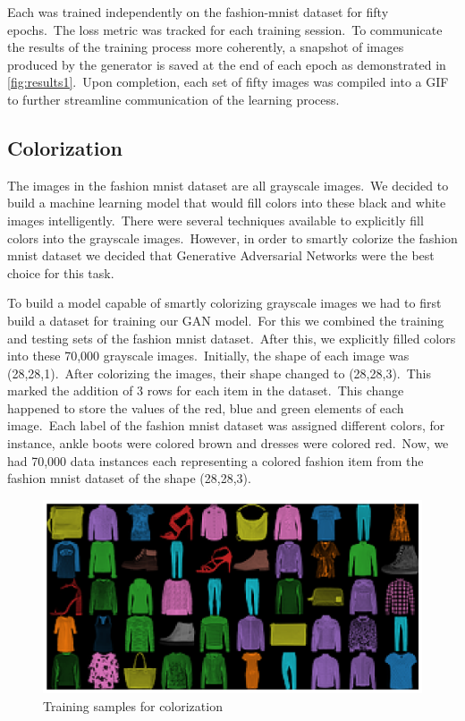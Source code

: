 \documentclass[conference]{IEEEtran}
\begin{document}
    Each was trained independently on the fashion-mnist dataset for fifty epochs.\ The loss metric was tracked for each training session.\ To communicate the results of the training process more coherently, a snapshot of images produced by the generator is saved at the end of each epoch as demonstrated in \autoref{fig:results1}.\ Upon completion, each set of fifty images was compiled into a GIF to further streamline communication of the learning process.

    \subsection{Colorization}\label{subsec:implementation-colorization}

    The images in the fashion mnist dataset are all grayscale images.\ We decided to build a machine learning model that would fill colors into these black and white images intelligently.\ There were several techniques available to explicitly fill colors into the grayscale images.\ However, in order to smartly colorize the fashion mnist dataset we decided that Generative Adversarial Networks were the best choice for this task.

    To build a model capable of smartly colorizing grayscale images we had to first build a dataset for training our GAN model.\ For this we combined the training and testing sets of the fashion mnist dataset.\ After this, we explicitly filled colors into these 70,000 grayscale images.\ Initially, the shape of each image was (28,28,1).\ After colorizing the images, their shape changed to (28,28,3).\ This marked the addition of 3 rows for each item in the dataset.\ This change happened to store the values of the red, blue and green elements of each image.\ Each label of the fashion mnist dataset was assigned different colors, for instance, ankle boots were colored brown and dresses were colored red.\ Now, we had 70,000 data instances each representing a colored fashion item from the fashion mnist dataset of the shape (28,28,3).

    \begin{figure}
        \caption{Training samples for colorization}
        \label{fig:colorization}
        \centering
        \includegraphics[scale = 0.33]{Colorization_training_samples.png}
    \end{figure}
\end{document}
